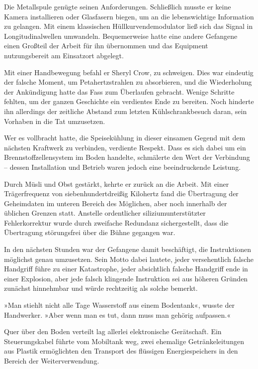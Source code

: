Die Metallspule genügte seinen Anforderungen. Schließlich musste er keine Kamera installieren oder Glasfasern biegen, um an die lebenswichtige Information zu gelangen. Mit einem klassischen Hüllkurvendemodulator ließ sich das Signal in Longitudinalwellen umwandeln. Bequemerweise hatte eine andere Gefangene einen Großteil der Arbeit für ihn übernommen und das Equipment nutzungsbereit am Einsatzort abgelegt.

Mit einer Handbewegung befahl er Sheryl Crow, zu schweigen. Dies war eindeutig der falsche Moment, um Petahertzstrahlen zu absorbieren, und die Wiederholung der Ankündigung hatte das Fass zum Überlaufen gebracht. Wenige Schritte fehlten, um der ganzen Geschichte ein verdientes Ende zu bereiten. Noch hinderte ihn allerdings der zeitliche Abstand zum letzten Kühlschrankbesuch daran, sein Vorhaben in die Tat umzusetzen.

Wer es vollbracht hatte, die Speisekühlung in dieser einsamen Gegend mit dem nächsten Kraftwerk zu verbinden, verdiente Respekt. Dass es sich dabei um ein Brennstoffzellensystem im Boden handelte, schmälerte den Wert der Verbindung – dessen Installation und Betrieb waren jedoch eine beeindruckende Leistung.

Durch Müsli und Obst gestärkt, kehrte er zurück an die Arbeit. Mit einer Trägerfrequenz von siebenhundertdreißig Kilohertz fand die Übertragung der Geheimdaten im unteren Bereich des Möglichen, aber noch innerhalb der üblichen Grenzen statt. Anstelle ordentlicher siliziumunterstützter Fehlerkorrektur wurde durch zweifache Redundanz sichergestellt, dass die Übertragung störungsfrei über die Bühne gegangen war.

In den nächsten Stunden war der Gefangene damit beschäftigt, die Instruktionen möglichst genau umzusetzen. Sein Motto dabei lautete, jeder versehentlich falsche Handgriff führe zu einer Katastrophe, jeder absichtlich falsche Handgriff ende in einer Explosion, aber jede falsch klingende Instruktion sei aus höheren Gründen zunächst hinnehmbar und würde rechtzeitig als solche bemerkt.

»Man stiehlt nicht alle Tage Wasserstoff aus einem Bodentank«, wusste der Handwerker. »Aber wenn man es tut, dann muss man gehörig aufpassen.«

Quer über den Boden verteilt lag allerlei elektronische Gerätschaft. Ein Steuerungskabel führte vom Mobiltank weg, zwei ehemalige Getränkeleitungen aus Plastik ermöglichten den Transport des flüssigen Energiespeichers in den Bereich der Weiterverwendung.

